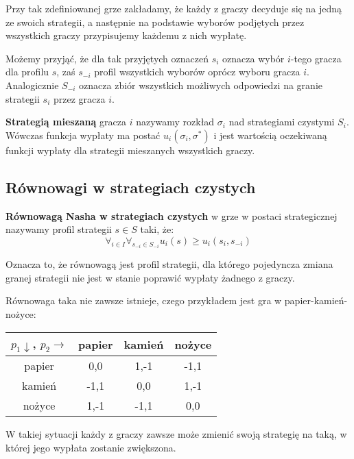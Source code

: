 \documentclass[polish]{standalone}
\begin{document}
Przy tak zdefiniowanej grze zakładamy, że każdy z graczy decyduje się na jedną ze swoich strategii, a następnie
na podstawie wyborów podjętych przez wszystkich graczy przypisujemy każdemu z nich wypłatę.

Możemy przyjąć, że dla tak przyjętych oznaczeń $s_i$ oznacza wybór $i$-tego gracza dla profilu $s$, zaś $s_{-i}$ profil
wszystkich wyborów oprócz wyboru gracza $i$. Analogicznie $S_{-i}$ oznacza zbiór wszystkich możliwych odpowiedzi
na granie strategii $s_i$ przez gracza $i$.

\begin{definition}
\textbf{Strategią mieszaną} gracza $i$ nazywamy rozkład $\sigma_i$ nad strategiami czystymi $S_i$. Wówczas funkcja
wypłaty ma postać $u_i(\sigma_i, \sigma^{*})$ i jest wartością oczekiwaną funkcji wypłaty dla strategii mieszanych
wszystkich graczy.
\cite[str.~5]{FT-GT}
\end{definition}

\subsection{Równowagi w strategiach czystych}

\begin{definition}
\textbf{Równowagą Nasha w strategiach czystych} w grze w postaci strategicznej nazywamy profil strategii $s \in S$ taki,
że:
$$\forall_{i \in I} \forall_{s_{-i} \in S_{-i}} u_i(s) \geq u_i(s_i, s_{-i})$$
\cite[str.~11]{FT-GT}
\end{definition}

Oznacza to, że równowagą jest profil strategii, dla którego pojedyncza zmiana granej strategii nie jest w stanie 
poprawić wypłaty żadnego z graczy.

Równowaga taka nie zawsze istnieje, czego przykładem jest gra w papier-kamień-nożyce:

\begin{tabular}[t]{| c | c | c | c |}
\hline
$p_1 \downarrow$, $p_2 \rightarrow$  & papier & kamień & nożyce \\
\hline
papier                               & 0,0    & 1,-1   & -1,1   \\
\hline
kamień                               & -1,1   & 0,0    & 1,-1   \\
\hline
nożyce                               & 1,-1   & -1,1   & 0,0    \\
\hline
\end{tabular}

W takiej sytuacji każdy z graczy zawsze może zmienić swoją strategię na taką, w której jego wypłata zostanie zwiększona.
\end{document}
